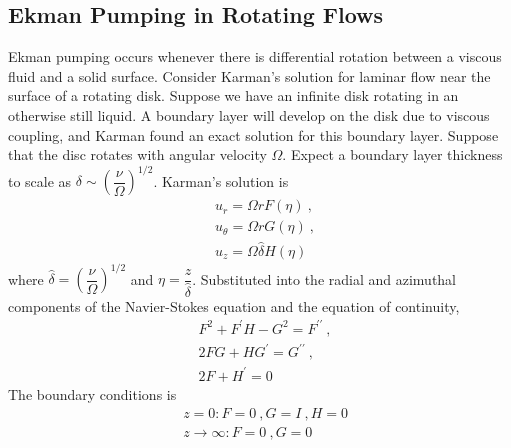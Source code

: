 \documentclass[12pt,a4paper]{article}
\begin{document}
\subsection{Ekman Pumping in Rotating Flows}
Ekman pumping occurs whenever there is differential rotation between a viscous fluid and a solid surface. Consider Karman's solution for laminar flow near the surface of a rotating disk. Suppose we have an infinite disk rotating in an otherwise still liquid. A boundary layer will develop on the disk due to viscous coupling, and Karman found an exact solution for this boundary layer. Suppose that the disc rotates with angular velocity $\Omega$. Expect a boundary layer thickness to scale as $\delta \sim \left(\dfrac{\nu}{\Omega} \right)^{1/2}$. Karman's solution is
\begin{align*}
& u_r = \Omega r F(\eta) ~, \\
& u_\theta = \Omega r G(\eta) ~, \\
& u_z = \Omega \hat{\delta} H(\eta)
\end{align*}
where $\hat{\delta} = \left(\dfrac{\nu}{\Omega} \right)^{1/2}$ and $\eta = \dfrac{z}{\hat{\delta}} $. Substituted into the radial and azimuthal components of the Navier-Stokes equation and the equation of continuity, 
\begin{align*}
& F^2 +F^\prime H -G^2 = F^{\prime\prime} ~, \\
& 2F G +H G^\prime = G^{\prime\prime} ~, \\
& 2F +H^\prime = 0
\end{align*}
The boundary conditions is
\begin{align*}
& z = 0 : F = 0 ~, G = I ~, H = 0 \\
& z \rightarrow \infty : F = 0 ~, G = 0
\end{align*}











































\end{document}

